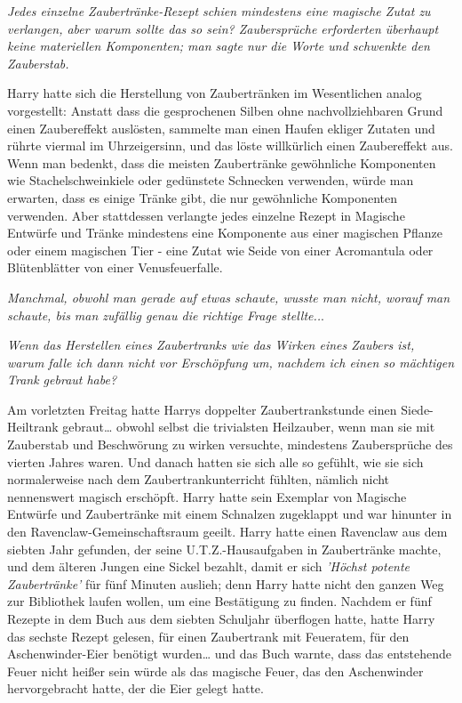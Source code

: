 {\emph{Jedes einzelne Zaubertränke-Rezept schien mindestens eine magische Zutat zu verlangen, aber warum sollte das so sein? Zaubersprüche erforderten überhaupt keine materiellen Komponenten; man sagte nur die Worte und schwenkte den Zauberstab.}

Harry hatte sich die Herstellung von Zaubertränken im Wesentlichen analog vorgestellt: Anstatt dass die gesprochenen Silben ohne nachvollziehbaren Grund einen Zaubereffekt auslösten, sammelte man einen Haufen ekliger Zutaten und rührte viermal im Uhrzeigersinn, und das löste willkürlich einen Zaubereffekt aus. Wenn man bedenkt, dass die meisten Zaubertränke gewöhnliche Komponenten wie Stachelschweinkiele oder gedünstete Schnecken verwenden, würde man erwarten, dass es einige Tränke gibt, die nur gewöhnliche Komponenten verwenden. Aber stattdessen verlangte jedes einzelne Rezept in Magische Entwürfe und Tränke mindestens eine Komponente aus einer magischen Pflanze oder einem magischen Tier - eine Zutat wie Seide von einer Acromantula oder Blütenblätter von einer Venusfeuerfalle.

\emph{Manchmal, obwohl man gerade auf etwas schaute, wusste man nicht, worauf man schaute, bis man zufällig genau die richtige Frage stellte..}.

\emph{Wenn das Herstellen eines Zaubertranks wie das Wirken eines Zaubers ist, warum falle ich dann nicht vor Erschöpfung um, nachdem ich einen so mächtigen Trank gebraut habe?}

Am vorletzten Freitag hatte Harrys doppelter Zaubertrankstunde einen Siede-Heiltrank gebraut… obwohl selbst die trivialsten Heilzauber, wenn man sie mit Zauberstab und Beschwörung zu wirken versuchte, mindestens Zaubersprüche des vierten Jahres waren. Und danach hatten sie sich alle so gefühlt, wie sie sich normalerweise nach dem Zaubertrankunterricht fühlten, nämlich nicht nennenswert magisch erschöpft. Harry hatte sein Exemplar von Magische Entwürfe und Zaubertränke mit einem Schnalzen zugeklappt und war hinunter in den Ravenclaw-Gemeinschaftsraum geeilt. Harry hatte einen Ravenclaw aus dem siebten Jahr gefunden, der seine U.T.Z.-Hausaufgaben in Zaubertränke machte, und dem älteren Jungen eine Sickel bezahlt, damit er sich \emph{'Höchst potente Zaubertränke'} für fünf Minuten auslieh; denn Harry hatte nicht den ganzen Weg zur Bibliothek laufen wollen, um eine Bestätigung zu finden. Nachdem er fünf Rezepte in dem Buch aus dem siebten Schuljahr überflogen hatte, hatte Harry das sechste Rezept gelesen, für einen Zaubertrank mit Feueratem, für den Aschenwinder-Eier benötigt wurden… und das Buch warnte, dass das entstehende Feuer nicht heißer sein würde als das magische Feuer, das den Aschenwinder hervorgebracht hatte, der die Eier gelegt hatte.

}
